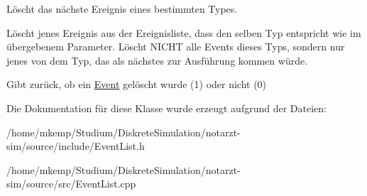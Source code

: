 Löscht das nächste Ereignis eines bestimmten Types. 

Löscht jenes Ereignis aus der Ereignisliste, dass den selben Typ entspricht wie im übergebenem Parameter. Löscht N\+I\+C\+HT alle Events dieses Typs, sondern nur jenes von dem Typ, das als nächstes zur Ausführung kommen würde.

Gibt zurück, ob ein \hyperlink{classEvent}{Event} gelöscht wurde (1) oder nicht (0) 

Die Dokumentation für diese Klasse wurde erzeugt aufgrund der Dateien\+:\begin{DoxyCompactItemize}
\item 
/home/mkemp/\+Studium/\+Diskrete\+Simulation/notarzt-\/sim/source/include/Event\+List.\+h\item 
/home/mkemp/\+Studium/\+Diskrete\+Simulation/notarzt-\/sim/source/src/Event\+List.\+cpp\end{DoxyCompactItemize}
